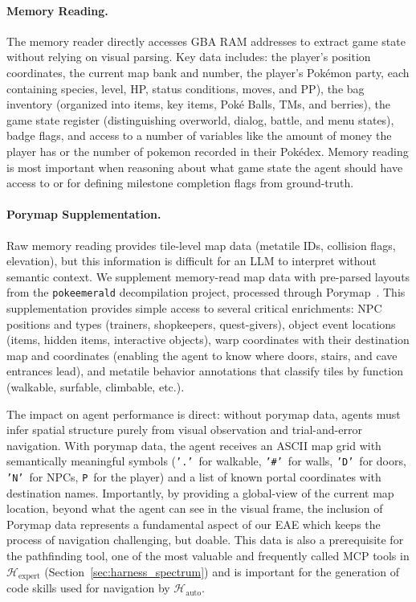 \paragraph{Memory Reading.} The memory reader directly accesses GBA RAM addresses to extract game state without relying on visual parsing. Key data includes: the player's position coordinates, the current map bank and number, the player's Pok\'{e}mon party, each containing species, level, HP, status conditions, moves, and PP), the bag inventory (organized into items, key items, Pok\'{e} Balls, TMs, and berries), the game state register (distinguishing overworld, dialog, battle, and menu states), badge flags, and access to a number of variables like the amount of money the player has or the number of pokemon recorded in their Pok\'{e}dex. Memory reading is most important when reasoning about what game state the agent should have access to or for defining milestone completion flags from ground-truth.

\paragraph{Porymap Supplementation.} Raw memory reading provides tile-level map data (metatile IDs, collision flags, elevation), but this information is difficult for an LLM to interpret without semantic context. We supplement memory-read map data with pre-parsed layouts from the \texttt{pokeemerald} decompilation project, processed through Porymap~\citep{huderlem2025porymap}. This supplementation provides simple access to several critical enrichments: NPC positions and types (trainers, shopkeepers, quest-givers), object event locations (items, hidden items, interactive objects), warp coordinates with their destination map and coordinates (enabling the agent to know where doors, stairs, and cave entrances lead), and metatile behavior annotations that classify tiles by function (walkable, surfable, climbable, etc.).

The impact on agent performance is direct: without porymap data, agents must infer spatial structure purely from visual observation and trial-and-error navigation. With porymap data, the agent receives an ASCII map grid with semantically meaningful symbols (\texttt{'.'}~for walkable, \texttt{'\#'}~for walls, \texttt{'D'}~for doors, \texttt{'N'}~for NPCs, \texttt{P}~for the player) and a list of known portal coordinates with destination names. Importantly, by providing a global-view of the current map location, beyond what the agent can see in the visual frame, the inclusion of Porymap data represents a fundamental aspect of our EAE which keeps the process of navigation challenging, but doable. This data is also a prerequisite for the pathfinding tool, one of the most valuable and frequently called MCP tools in $\mathcal{H}_{\text{expert}}$ (Section~\ref{sec:harness_spectrum}) and is important for the generation of code skills used for navigation by $\mathcal{H}_{\text{auto}}$.

